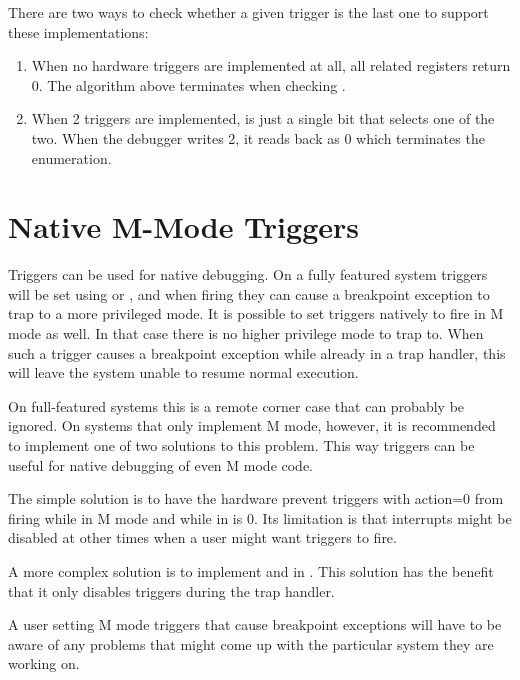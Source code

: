 \begin{commentary}
    There are two ways to check whether a given trigger is the last one to
    support these implementations:
    \begin{enumerate}
        \item When no hardware triggers are implemented at all, all related
            registers return 0. The algorithm above terminates when checking
            \Ftype.
        \item When 2 triggers are implemented, \Rtselect is just a single bit
            that selects one of the two. When the debugger writes 2, it reads
            back as 0 which terminates the enumeration.
    \end{enumerate}
\end{commentary}

\section{Native M-Mode Triggers}
\label{sec:mmtrigger}

Triggers can be used for native debugging. On a fully featured system triggers
will be set using \Fu or \Fs, and when firing they can cause a breakpoint exception
to trap to a more privileged mode. It is possible to set triggers natively to
fire in M mode as well. In that case there is no higher privilege mode to trap
to. When such a trigger causes a breakpoint exception while already in a trap
handler, this will leave the system unable to resume normal execution.

On full-featured systems this is a remote corner case that can probably be
ignored. On systems that only implement M mode, however, it is recommended to
implement one of two solutions to this problem. This way triggers can be useful
for native debugging of even M mode code.

The simple solution is to have the hardware prevent triggers with action=0 from
firing while in M mode and while \Fmie in \Rmstatus is 0. Its limitation is
that interrupts might be disabled at other times when a user might want
triggers to fire.

A more complex solution is to implement \Fmte and \Fmpte in \Rtcontrol. This
solution has the benefit that it only disables triggers during the trap
handler.

A user setting M mode triggers that cause breakpoint exceptions will have to be
aware of any problems that might come up with the particular system they are
working on.


